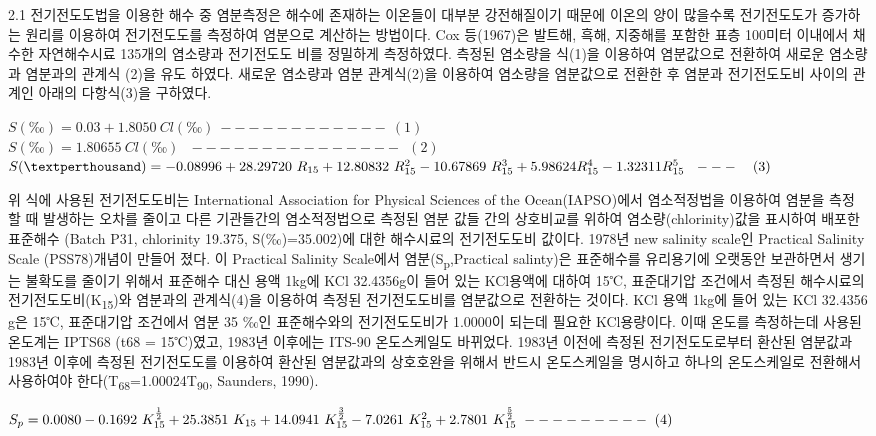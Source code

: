 \documentclass[
]{book}
\begin{document}
2.1 전기전도도법을 이용한 해수 중 염분측정은 해수에 존재하는 이온들이 대부분 강전해질이기 때문에 이온의 양이 많을수록 전기전도도가 증가하는 원리를 이용하여 전기전도도를 측정하여 염분으로 계산하는 방법이다. Cox 등(1967)은 발트해, 흑해, 지중해를 포함한 표층 100미터 이내에서 채수한 자연해수시료 135개의 염소량과 전기전도도 비를 정밀하게 측정하였다. 측정된 염소량을 식(1)을 이용하여 염분값으로 전환하여 새로운 염소량과 염분과의 관계식 (2)을 유도 하였다. 새로운 염소량과 염분 관계식(2)을 이용하여 염소량을 염분값으로 전환한 후 염분과 전기전도도비 사이의 관계인 아래의 다항식(3)을 구하였다.

\(S(‰)=0.03 + 1.8050 ~ Cl(‰) ~------------~~ (1)\)\\
\(S(‰)=1.80655 ~ Cl(‰) ~~~ ---------------~~ (2)\)\\
\(S(‰)= -0.08996 + 28.29720 ~ R_{15} + 12.80832~ R_{15}^2 \\ -10.67869 ~ R_{15}^3 + 5.98624 R_{15}^4 - 1.32311 R_{15}^5 ~~--- ~~~(3)\)

위 식에 사용된 전기전도도비는 International Association for Physical Sciences of the Ocean(IAPSO)에서 염소적정법을 이용하여 염분을 측정 할 때 발생하는 오차를 줄이고 다른 기관들간의 염소적정법으로 측정된 염분 값들 간의 상호비교를 위하여 염소량(chlorinity)값을 표시하여 배포한 표준해수 (Batch P31, chlorinity 19.375, S(‰)=35.002)에 대한 해수시료의 전기전도도비 값이다.
1978년 new salinity scale인 Practical Salinity Scale (PSS78)개념이 만들어 졌다. 이 Practical Salinity Scale에서 염분(S\textsubscript{p},Practical salinty)은 표준해수를 유리용기에 오랫동안 보관하면서 생기는 불확도를 줄이기 위해서 표준해수 대신 용액 1kg에 KCl 32.4356g이 들어 있는 KCl용액에 대하여 15℃, 표준대기압 조건에서 측정된 해수시료의 전기전도도비(K\textsubscript{15})와 염분과의 관계식(4)을 이용하여 측정된 전기전도도비를 염분값으로 전환하는 것이다. KCl 용액 1kg에 들어 있는 KCl 32.4356 g은 15℃, 표준대기압 조건에서 염분 35 ‰인 표준해수와의 전기전도도비가 1.0000이 되는데 필요한 KCl용량이다. 이때 온도를 측정하는데 사용된 온도계는 IPTS68 (t68 = 15℃)였고, 1983년 이후에는 ITS-90 온도스케일도 바뀌었다. 1983년 이전에 측정된 전기전도도로부터 환산된 염분값과 1983년 이후에 측정된 전기전도도를 이용하여 환산된 염분값과의 상호호완을 위해서 반드시 온도스케일을 명시하고 하나의 온도스케일로 전환해서 사용하여야 한다(T\textsubscript{68}=1.00024T\textsubscript{90}, Saunders, 1990).

\(S_p=0.0080 - 0.1692 ~ K_{15}^{\frac{1}{2}} +25.3851 ~ K_{15} + 14.0941 ~ K_{15}^{\frac{3}{2}} \\ -7.0261 ~ K_{15}^2 + 2.7801 ~ K_{15}^{\frac{5}{2}}~---------~(4)\)
\end{document}
